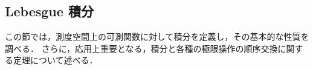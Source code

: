 \subsection{Lebesgue 積分}\label{sec:integration}

この節では，測度空間上の可測関数に対して積分を定義し，その基本的な性質を調べる．
さらに，応用上重要となる，積分と各種の極限操作の順序交換に関する定理について述べる．




